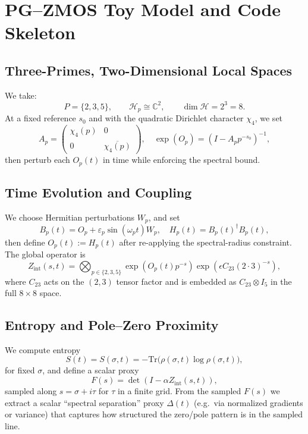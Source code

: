 \documentclass[11pt]{article}
\begin{document}
\section{PG--ZMOS Toy Model and Code Skeleton}

\subsection{Three-Primes, Two-Dimensional Local Spaces}

We take:
\[
  P = \{2,3,5\},\qquad \mathcal{H}_p \cong \mathbb{C}^2,
  \qquad \dim \mathcal{H} = 2^3 = 8.
\]
At a fixed reference $s_0$ and with the quadratic Dirichlet character
$\chi_4$, we set
\[
  A_p = \begin{pmatrix}\chi_4(p) & 0\\ 0 & \overline{\chi_4(p)}\end{pmatrix},
  \quad \exp(O_p) = (I - A_p p^{-s_0})^{-1},
\]
then perturb each $O_p(t)$ in time while enforcing the spectral bound.

\subsection{Time Evolution and Coupling}

We choose Hermitian perturbations $W_p$, and set
\[
  B_p(t) = O_p + \varepsilon_p \sin(\omega_p t) W_p,
  \quad H_p(t) = B_p(t)^\dagger B_p(t),
\]
then define $O_p(t) := H_p(t)$ after re-applying the spectral-radius
constraint. The global operator is
\[
  Z_{\mathrm{int}}(s,t) =
  \bigotimes_{p\in\{2,3,5\}} \exp\!\left(O_p(t) p^{-s}\right)
  \exp\!\left(\epsilon C_{23} (2\cdot 3)^{-s}\right),
\]
where $C_{23}$ acts on the $(2,3)$ tensor factor and is embedded as
$C_{23}\otimes I_{5}$ in the full $8\times 8$ space.

\subsection{Entropy and Pole--Zero Proximity}

We compute entropy
\[
  S(t) = S(\sigma,t) =
  -\mathrm{Tr}\bigl(\rho(\sigma,t)\log \rho(\sigma,t)\bigr),
\]
for fixed $\sigma$, and define a scalar proxy
\[
  F(s) = \det(I - \alpha Z_{\mathrm{int}}(s,t)),
\]
sampled along $s = \sigma + i\tau$ for $\tau$ in a finite grid. From
the sampled $F(s)$ we extract a scalar ``spectral separation'' proxy
$\Delta(t)$ (e.g.\ via normalized gradients or variance) that captures
how structured the zero/pole pattern is in the sampled line.
\end{document}
